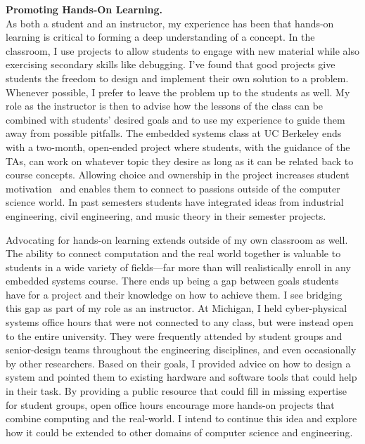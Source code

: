 \documentclass[11pt]{article} %
\begin{document}
\bigskip
\textbf{\textsf{\large Promoting Hands-On Learning.}}\\
As both a student and an instructor, my experience has been that hands-on
learning is critical to forming a deep understanding of a concept. In the
classroom, I use projects to allow students to engage with new material while
also exercising secondary skills like debugging. I've found that good projects
give students the freedom to design and implement their own solution to a
problem. Whenever possible, I prefer to leave the problem up to the students as
well. My role as the instructor is then to advise how the lessons of the class
can be combined with students' desired goals and to use my experience to guide
them away from possible pitfalls. The embedded systems class at UC Berkeley
ends with a two-month, open-ended project where students, with the guidance of
the TAs, can work on whatever topic they desire as long as it can be related
back to course concepts. Allowing choice and ownership in the project increases
student motivation~\footnotemark{} and enables them to connect to passions outside
of the computer science world. In past semesters students have integrated ideas
from industrial engineering, civil engineering, and music theory in their
semester projects.


Advocating for hands-on learning extends outside of my own classroom as well.
The ability to connect computation and the real world together is valuable to
students in a wide variety of fields---far more than will realistically enroll
in any embedded systems course.
%
There ends up being a gap between goals students have for a project and their
knowledge on how to achieve them.
I see bridging this gap as part of my role as an instructor.
%
At Michigan, I held cyber-physical systems office hours that were not connected
to any class, but were instead open to the entire university. They were
frequently attended by student groups and senior-design teams throughout the
engineering disciplines, and even occasionally by other researchers.
%
Based on their goals, I provided advice on how to design a
system and pointed them to existing hardware and software tools that could help
in their task.
%
By providing a public resource that could fill in missing
expertise for student groups, open office hours encourage more hands-on
projects that combine computing and the real-world. I intend to continue this
idea and explore how it could be extended to other domains of computer science
and engineering.
\end{document}
